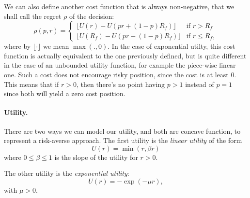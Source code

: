 We can also define another cost function that is always non-negative, that we shall call the
regret $\rho$ of the decision:
\begin{equation*}
  \rho(p,r) =
  \begin{cases}
    \lfloor U(r) - U(pr + (1-p)R_f)\rfloor & \text{if } r>R_f\\
    \lfloor U(R_f) - U(pr + (1-p)R_f)\rfloor &\text{if } r\leq R_f,
  \end{cases}
\end{equation*}
where by $\lfloor \cdot \rfloor$ we mean $\max(.,0)$. In the case of exponential
utilty, this cost function is actually equivalent to the one previously defined, but is
quite different in the case of an unbounded utility function, for example the piece-wise
linear one. Such a cost does not encourage risky position, since the cost is at least
0. This means that if $r>0$, then there's no point having $p>1$ instead of $p=1$ since
both will yield a zero cost position. 

\paragraph{Utility.}
There are two ways we can model our utility, and both are concave function, to represent a
risk-averse approach. The first utility is the \emph{linear utility} of the form
\begin{equation}
  \label{linearUtility}
  U(r) = \min(r, \beta r)
\end{equation}
where $0\leq\beta\leq1$ is the slope of the utility for $r>0$. 

The other utility is the \emph{exponential utility}:
\begin{equation}
  \label{expUtility}
  U(r) = -\exp(-\mu r),
\end{equation}
with $\mu > 0$.

